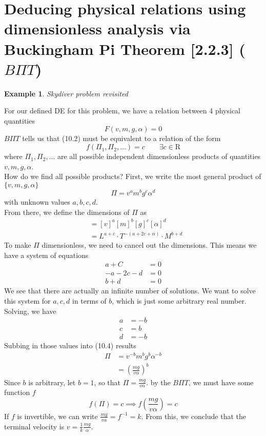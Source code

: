 \documentclass{report}
\newtheorem{ex}{Example}[section]
\begin{document}
\section{Deducing physical relations using dimensionless analysis via Buckingham Pi Theorem [2.2.3] ($B\Pi T$)}
\begin{ex}
Skydiver problem revisited
\end{ex}
For our defined DE for this problem, we have a relation between 4 physical quantities
\begin{equation}
F(v,m,g,\alpha) = 0 
\end{equation}
$B\Pi T$ tells us that (10.2) must be equivalent to a relation of the form
\begin{equation}
f(\Pi_1, \Pi_2, \ldots) = c \qquad \exists c \in \mathrm{R}
\end{equation}
where $\Pi_1, \Pi_2, \ldots$ are all possible independent dimensionless products of quantities $v,m,g,\alpha$.\\
How do we find all possible products? First, we write the most general product of $\{v,m,g,\alpha\}$
\begin{equation}
\Pi = v^a m^bg^c\alpha^d
\end{equation}
with unknown values $a,b,c,d$.\\
From there, we define the dimensions of $\Pi$ as
\begin{align}
[\Pi] &= [v]^a [m]^b [g]^c[\alpha]^d \\
&= L^{a+c}\cdot T^{-(a+2c+\alpha)}\cdot M^{b+d}
\end{align}
To make $\Pi$ dimensionless, we need to cancel out the dimensions. This means we have a system of equations
\begin{align*}
a + C &= 0 \\
-a - 2c - d &= 0 \\
b+d &= 0
\end{align*}
We see that there are actually an infinite number of solutions. We want to solve this system for $a,c,d$ in terms of $b$, which is just some arbitrary real number. Solving, we have
\begin{align*}
a&= -b \\
c &= b \\
d &= -b
\end{align*}
Subbing in those values into (10.4) results
\begin{align}
\Pi &= v^{-b}m^bg^b\alpha^{-b} \\
&= \left(\frac{mg}{v\alpha}\right)^b
\end{align}
Since $b$ is arbitrary, let $b=1$, so that $\Pi = \frac{mg}{v\alpha}$. by the $B\Pi T$, we must have some function $f$
$$f(\Pi) = c \implies f\left(\frac{mg}{v\alpha}\right) = c$$
If $f$ is invertible, we can write $\frac{mg}{v\alpha} = f^{-1} = k$. From this, we conclude that the terminal velocity is $v = \frac{1}{k}\frac{mg}{\alpha}$.
\end{document}
